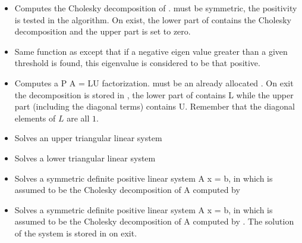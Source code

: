 \begin{itemize}
\item {}
  \sshortdescribe Computes the Cholesky decomposition of .  must
  be symmetric, the positivity is tested in the algorithm. On exist, the lower
  part of  contains the Cholesky decomposition and the upper part is
  set to zero.

\item {}
  \sshortdescribe Same function as  except that if a negative
  eigen value greater than a given threshold is found, this eigenvalue is
  considered to be that positive.

\item {} 
  \sshortdescribe Computes a P A = LU factorization.  must be an
  already allocated  . On exit the decomposition is
  stored in , the lower part of  contains L while the upper part
  (including the diagonal terms) contains U. Remember that the diagonal
  elements of $L$ are all $1$.


\item {}
  \sshortdescribe Solves an upper triangular linear system 

\item {}
  \sshortdescribe Solves a lower triangular linear system  
  

\item {} 
  \sshortdescribe Solves a symmetric definite positive linear system A x = b, 
  in which  is assumed to be the Cholesky decomposition of A
  computed by 


\item {} 
  \sshortdescribe Solves a symmetric definite positive linear system A x = b, 
  in which  is assumed to be the Cholesky decomposition of A
  computed by . The solution of the system is stored in
   on exit.


\end{itemize}
